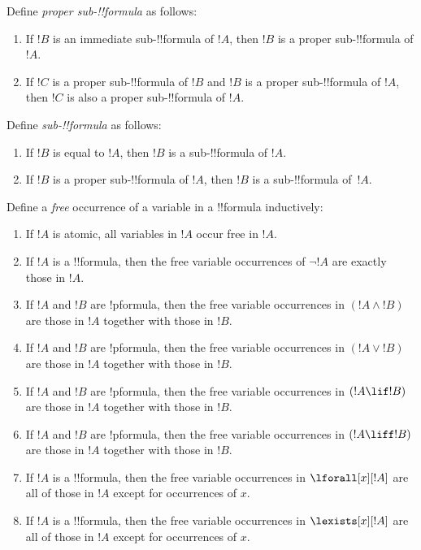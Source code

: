 \documentclass[../../include/open-logic-section]{subfiles}
\begin{document}
\begin{defn}
Define \emph{proper sub-!!{formula}} as follows:
\begin{enumerate}
\item If $!B$ is an immediate sub-!!{formula} of $!A$, then $!B$ is a
  proper sub-!!{formula} of $!A$.
\item If $!C$ is a proper sub-!!{formula} of $!B$ and $!B$ is a proper
  sub-!!{formula} of $!A$, then $!C$ is also a proper sub-!!{formula} of $!A$.
\end{enumerate}
\end{defn}

\begin{defn}
Define \emph{sub-!!{formula}} as follows:
\begin{enumerate}
\item If $!B$ is equal to $!A$, then $!B$ is a sub-!!{formula} of $!A$.
\item If $!B$ is a proper sub-!!{formula} of $!A$, then $!B$ is a
  sub-!!{formula} of~$!A$.
\end{enumerate}
\end{defn}


\begin{defn}
Define a \emph{free} occurrence of a variable in a !!{formula} inductively:
\begin{enumerate}
\item If $!A$ is atomic, all variables in $!A$ occur free in $!A$.
\item If $!A$ is a !!{formula}, then the free variable occurrences of
  $\lnot !A$ are exactly those in $!A$.
\item If $!A$ and $!B$ are !p{formula}, then the free variable
  occurrences in $(!A \land !B)$ are those in $!A$ together with those
  in $!B$.
\item If $!A$ and $!B$ are !p{formula}, then the free variable
  occurrences in $(!A \lor !B)$ are those in $!A$ together with those
  in $!B$.
\item If $!A$ and $!B$ are !p{formula}, then the free variable
  occurrences in $(!A \lif !B)$ are those in $!A$ together with those
  in $!B$.
\item If $!A$ and $!B$ are !p{formula}, then the free variable
  occurrences in $(!A \liff !B)$ are those in $!A$ together with those
  in $!B$.
\item If $!A$ is a !!{formula}, then the free variable occurrences in
  $\lforall[x][!A]$ are all of those in $!A$ except for occurrences of
  $x$.
\item If $!A$ is a !!{formula}, then the free variable occurrences in
  $\lexists[x][!A]$ are all of those in $!A$ except for occurrences of
  $x$.
\end{enumerate}
\end{defn}
\end{document}
